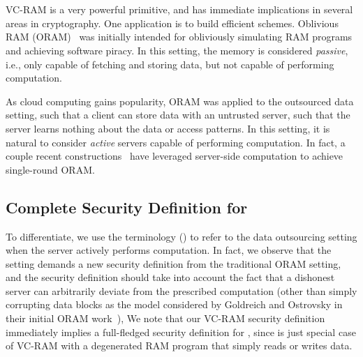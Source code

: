 
\section{\namebig}
\label{sec:vos}
VC-RAM is a very powerful primitive, and has immediate implications in
several areas in cryptography.
One application is to build efficient \name schemes. 
Oblivious RAM (ORAM)~\cite{oram00,oram01,oram02,oram03,oram07,oram09,oram13} 
was initially intended for obliviously simulating RAM programs 
and achieving software piracy.
In this setting, the memory is considered 
{\it passive}, i.e., only
capable of fetching and storing data, but not capable of performing
computation.

As cloud computing gains popularity, ORAM was 
applied to the outsourced data setting, such that
a client can store data with an untrusted server,
such that the server learns nothing about the data or
access patterns. In this setting, it is natural to consider
{\it active} servers capable of performing computation. 
In fact, a couple recent constructions~\cite{oram14,LO12} 
have leveraged server-side computation to achieve single-round ORAM.


\subsection{Complete Security Definition for \nameshort}
To differentiate, we use the terminology \name (\nameshort) 
to refer to the data outsourcing setting when the server
actively performs computation.
In fact, we observe that the \nameshort setting demands a new security
definition from the traditional ORAM setting, and the security
definition should take into account the fact that a dishonest
server can arbitrarily deviate from the prescribed computation (other
than simply corrupting data blocks as the model considered
by Goldreich and Ostrovsky in their initial ORAM work~\cite{oram00}),
We note that our VC-RAM security definition immediately implies 
a full-fledged security definition for \nameshort, since
\nameshort is just special case of VC-RAM with 
a degenerated RAM program that simply reads or
writes data.


